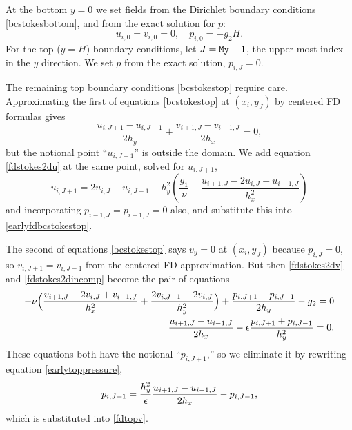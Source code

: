 At the bottom $y=0$ we set fields from the Dirichlet boundary conditions \eqref{bcstokesbottom}, and from the exact solution for $p$:
\begin{equation}
  u_{i,0} = v_{i,0} = 0, \quad p_{i,0} = - g_2 H. \label{fdbcstokesbottom}
\end{equation}
For the top ($y=H$) boundary conditions, let $J=\text{\texttt{My}}-1$, the upper most index in the $y$ direction.  We set $p$ from the exact solution, $p_{i,J} = 0$.

The remaining top boundary conditions \eqref{bcstokestop} require care.  Approximating the first of equations \eqref{bcstokestop} at $(x_i,y_J)$ by centered FD formulas gives
\begin{equation}
  \frac{u_{i,J+1}-u_{i,J-1}}{2h_y} + \frac{v_{i+1,J}-v_{i-1,J}}{2h_x} = 0, \label{earlyfdbcstokestop}
\end{equation}
but the notional point ``$u_{i,J+1}$'' is outside the domain.  We add equation \eqref{fdstokes2du} at the same point, solved for $u_{i,J+1}$,
\begin{equation}
  u_{i,J+1} = 2 u_{i,J} - u_{i,J-1} - h_y^2 \left(\frac{g_1}{\nu} + \frac{u_{i+1,J} - 2 u_{i,J} + u_{i-1,J}}{h_x^2}\right) \label{earlyfdstokes2dutop} 
\end{equation}
and incorporating $p_{i-1,J}=p_{i+1,J}=0$ also, and substitute this into \eqref{earlyfdbcstokestop}.

The second of equations \eqref{bcstokestop} says $v_y=0$ at $(x_i,y_J)$ because $p_{i,J}=0$, so $v_{i,J+1} = v_{i,J-1}$ from the centered FD approximation.  But then \eqref{fdstokes2dv} and \eqref{fdstokes2dincomp} become the pair of equations
\begin{align}
-\nu \Big(\frac{v_{i+1,J} - 2 v_{i,J} + v_{i-1,J}}{h_x^2} + \frac{2 v_{i,J-1} - 2 v_{i,J}}{h_y^2}\Big) + \frac{p_{i,J+1}-p_{i,J-1}}{2h_y} - g_2 = 0 \label{fdtopv} \\
\frac{u_{i+1,J}-u_{i-1,J}}{2h_x}  - \epsilon \frac{p_{i,J+1} + p_{i,J-1}}{h_y^2} = 0. \label{earlytoppressure}
\end{align}
These equations both have the notional ``$p_{i,J+1}$,'' so we eliminate it by rewriting equation \eqref{earlytoppressure},
\begin{equation}
p_{i,J+1} = \frac{h_y^2}{\epsilon} \frac{u_{i+1,J}-u_{i-1,J}}{2h_x} - p_{i,J-1},\label{fdtoppressureelim}
\end{equation}
which is substituted into \eqref{fdtopv}.

